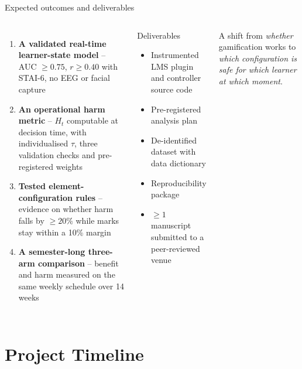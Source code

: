 \documentclass[10pt]{beamer}
\begin{document}
\begin{frame}{Expected outcomes and deliverables}
\begin{columns}[T]
    \begin{enumerate}\itemsep4pt
        \item \textbf{A validated real-time learner-state model} -- AUC $\ge 0.75$,
        $r \ge 0.40$ with STAI-6, no EEG or facial capture
        \item \textbf{An operational harm metric} -- $H_t$ computable at decision time, with
        individualised $\tau$, three validation checks and pre-registered weights
        \item \textbf{Tested element-configuration rules} -- evidence on whether harm falls by
        $\ge 20\%$ while marks stay within a 10\% margin
        \item \textbf{A semester-long three-arm comparison} -- benefit and harm measured on the
        same weekly schedule over 14 weeks
    \end{enumerate}
    \begin{block}{Deliverables}
        \begin{itemize}\itemsep0pt
            \item Instrumented LMS plugin and controller source code
            \item Pre-registered analysis plan
            \item De-identified dataset with data dictionary
            \item Reproducibility package
            \item $\ge 1$ manuscript submitted to a peer-reviewed venue
        \end{itemize}
    \end{block}
    \vspace{0.2cm}
    \begin{keybox}
    A shift from \emph{whether} gamification works to \emph{which configuration is safe for
    which learner at which moment}.
    \end{keybox}
\end{columns}
\end{frame}


\section{Project Timeline}
\end{document}
